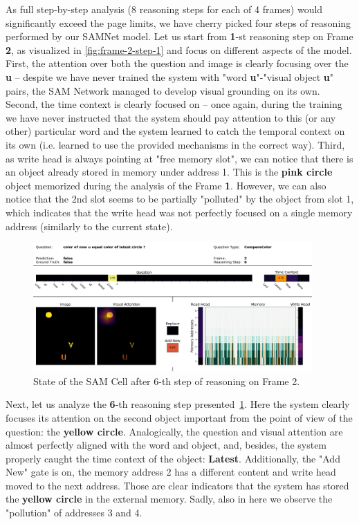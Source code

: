 As full step-by-step analysis (8 reasoning steps for each of 4 frames) would significantly exceed the page limits, we have cherry picked four steps of reasoning performed by our SAMNet model.
Let us start from \textbf{1}-st reasoning step on Frame \textbf{2}, as visualized in \cref{fig:frame-2-step-1} and focus on different aspects of the model.
First, the attention over both the question and image is clearly focusing over the \textbf{u} -- despite we have never trained the system with "word \textbf{u}"-"visual object \textbf{u}" pairs, the SAM Network managed to develop visual grounding on its own.
Second, the time context is clearly focused on  -- once again, during the training we have never instructed that the system should pay attention to this (or any other) particular word and the system learned to catch the temporal context on its own (i.e. learned to use the provided mechanisms in the correct way).
Third, as write head is always pointing at "free memory slot", we can notice that there is an object already stored in memory under address 1.
This is the \textbf{pink circle} object memorized during the analysis of the Frame \textbf{1}.
However, we can also notice that the 2nd slot seems to be partially "polluted" by the object from slot 1, which indicates that the write head was not perfectly focused on a single memory address (similarly to the current state).


\begin{figure}[!h]
\centering
  \includegraphics[width=0.95\textwidth]{"../img/visualization/sample 2/Frame 2 Step 6"}
\caption{State of the SAM Cell after 6-th step of reasoning on Frame 2.} 
\label{fig:frame-2-step-6}
\end{figure}

Next, let us analyze the \textbf{6}-th reasoning step presented~\cref{fig:frame-2-step-6}.
Here the system clearly focuses its attention on the second object important from the point of view of the question: the \textbf{yellow circle}.
Analogically, the question and visual attention are almost perfectly aligned with the word and object, and, besides, the system  properly caught the time context of the object: \textbf{Latest}.
Additionally, the "Add New" gate is on, the memory address 2 has a different content and write head moved to the next address.
Those are clear indicators that the system has stored the \textbf{yellow circle} in the external memory.
Sadly, also  in here we observe the "pollution" of addresses 3 and 4.

